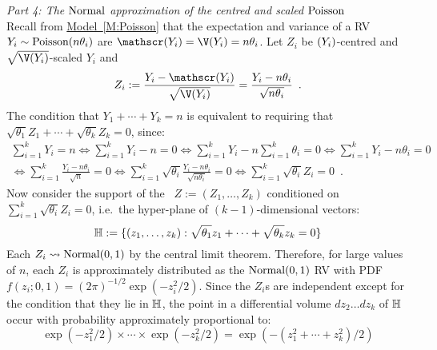 {\em Part 4: The $\mbox{{\rm Normal}}$ approximation of the centred and scaled $\mbox{{\rm Poisson}}$}\\
Recall from \hyperref[M:Poisson]{Model~\ref*{M:Poisson}} that the expectation and variance of a RV $Y_i \sim \mbox{{\rm Poisson}}(n\theta_i)$ are $\E(Y_i)=\V(Y_i)=n\theta_i$.  Let $Z_i$ be $\mathscr{(}Y_i)$-centred and $\sqrt{\V(Y_i)}$-scaled $Y_i$ and \[
Z_i :=  \frac{Y_i - \E(Y_i)}{\sqrt{\V(Y_i)}} = \frac{Y_i - n \theta_i}{\sqrt{n \theta_i}} \enspace .
\]
The condition that $Y_1+\cdots+Y_k=n$ is equivalent to requiring that $\sqrt{\theta_1} Z_1 +\cdots+\sqrt{\theta_k} Z_k = 0$, since:
\begin{multline*}
\sum_{i=1}^k {Y_i} =n 
\iff \sum_{i=1}^k {Y_i} -n = 0
\iff \sum_{i=1}^k {Y_i} - n \sum_{i=1}^k {\theta_i} = 0
\iff \sum_{i=1}^k {Y_i - n \theta_i} = 0 \\
\iff \sum_{i=1}^k  \frac{Y_i - n \theta_i}{\sqrt{n }} = 0
\iff \sum_{i=1}^k \sqrt{\theta_i} \frac{Y_i - n \theta_i}{\sqrt{n \theta_i}} = 0
\iff \sum_{i=1}^k \sqrt{\theta_i} Z_i = 0 \enspace .
\end{multline*}
Now consider the support of the \rv~$Z:=(Z_1,\ldots,Z_k)$ conditioned on $\sum_{i=1}^k \sqrt{\theta_i} Z_i = 0$, i.e.~the hyper-plane of $(k-1)$-dimensional vectors:
\[
\mathbb{H} := \{ (z_1,\ldots,z_k) : \sqrt{\theta_1} z_1 +\cdots+\sqrt{\theta_k} z_k = 0 \} 
\]
Each $Z_i \rightsquigarrow \mbox{{\rm Normal}}(0,1)$ by the central limit theorem.  Therefore, for large values of $n$, each $Z_i$ is approximately distributed as the $\mbox{{\rm Normal}}(0,1)$ RV with PDF $f(z_i;0,1)=(2\pi)^{-1/2}\exp(-z_i^2/2)$.  Since the $Z_i$s are independent except for the condition that they lie in $\mathbb{H}$, the point in a differential volume $dz_2\ldots dz_k$ of $\mathbb{H}$ occur with probability approximately proportional to:
 \[
 \exp(-z_1^2/2) \times \cdots \times \exp(-z_k^2/2)  = \exp(-(z_1^2+\cdots+z_k^2)/2)
 \]

